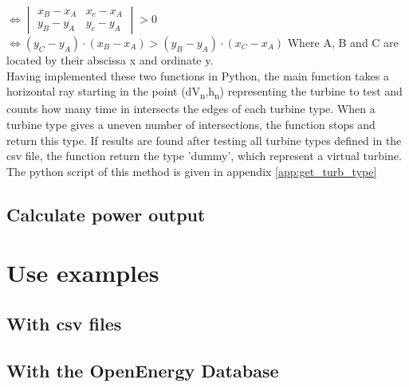 \tabto{2.5cm}$\iff \begin{vmatrix}x_B-x_A&x_c-x_A\\y_B-y_A&y_c-y_A\end{vmatrix}>0$\newline\\
\tabto{2.5cm}$\iff (y_C-y_A)\cdot(x_B-x_A) > (y_B-y_A)\cdot(x_C-x_A)$ \newline
Where A, B and C are located by their abscissa x and ordinate y. \newline
\\
Having implemented these two functions in Python, the main function takes a horizontal ray starting in the point (dV\textsubscript{n},h\textsubscript{n}) representing the turbine to test and counts how many time in intersects the edges of each turbine type. When a turbine type gives a uneven number of intersections, the function stops and return this type. If results are found after testing all turbine types defined in the csv file, the function return the type 'dummy', which represent a virtual turbine. \newline
The python script of this method is given in appendix \ref{app:get_turb_type}


\subsection{Calculate power output}
\section{Use examples}
\subsection{With csv files}
\label{sub:ex_with_csv}
\subsection{With the OpenEnergy Database}
\label{sub:ex_with_oedb}
